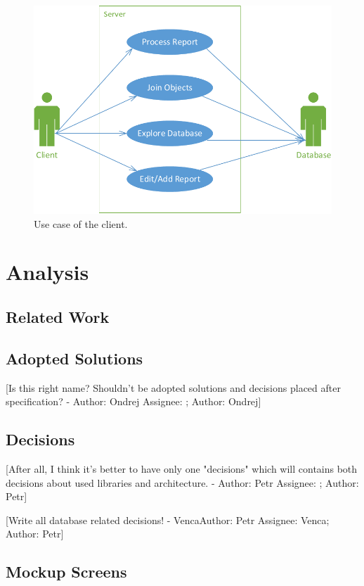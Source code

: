 \documentclass[12pt,a4paper]{report}
\makeatletter
\newcommand{\comment}[3][\@empty]{
  {\color{magenta}[#3 - }
  {\color{green}\ifx\@empty#1\relax Author: #2 \else Assignee: #1; Author: #2\fi}{\color{magenta}]}
}
\makeatother
\begin{document}
\begin{figure}[!htb]
        \centering
        \includegraphics[width=\textwidth]{Images/UseCase2}
        \caption{Use case of the client.}
        \label{fig:UseCase2}
\end{figure}

\chapter{Analysis}

\section{Related Work}


\section{Adopted Solutions}
\comment{Ondrej}{Is this right name? Shouldn't be adopted solutions and decisions placed after specification?}



\section{Decisions}
\label{sec:Decisions}

\comment{Petr}{After all, I think it's better to have only one "decisions" which
will contains both decisions about used libraries and architecture.}

\comment[Venca]{Petr}{\huge{Write all database related decisions!}}

\section{Mockup Screens}
	
\end{document}
